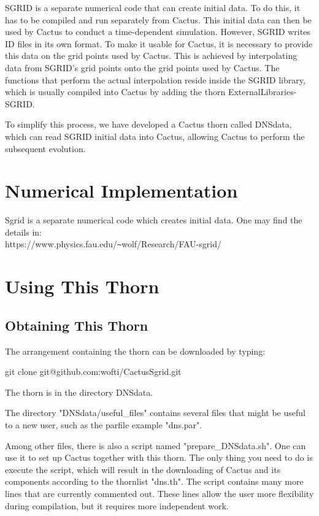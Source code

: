 SGRID is a separate numerical code that can create initial data. To do this,
it has to be compiled and run separately from Cactus.
This initial data can then be used by Cactus to conduct a time-dependent
simulation. However, SGRID writes ID files in its own format. To make it
usable for Cactus, it is necessary to provide this data on the grid points
used by Cactus. This is achieved by interpolating data from SGRID's grid
points onto the grid points used by Cactus. The functions that perform the
actual interpolation reside inside the SGRID library, which is usually
compiled into Cactus by adding the thorn ExternalLibraries-SGRID.

To simplify this process, we have developed a Cactus thorn called DNSdata,
which can read SGRID initial data into Cactus, allowing Cactus to perform
the subsequent evolution.


\section{Numerical Implementation}

Sgrid is a separate numerical code which creates initial data. One may find the details
in: \\
https://www.physics.fau.edu/\verb!~!wolf/Research/FAU-sgrid/

\section{Using This Thorn}

\subsection{Obtaining This Thorn}

The arrangement containing the thorn can be downloaded by typing:

git clone git@github.com:wofti/CactusSgrid.git

The thorn is in the directory DNSdata.

The directory "DNSdata/useful\_files" contains several files that might
be useful to a new user, such as the parfile example "dns.par".

Among other files, there is also a script named "prepare\_DNSdata.sh". One
can use it to set up Cactus together with this thorn. The only thing you
need to do is execute the script, which will result in the downloading of
Cactus and its components according to the thornlist "dns.th". The script
contains many more lines that are currently commented out. These lines allow
the user more flexibility during compilation, but it requires more
independent work.

